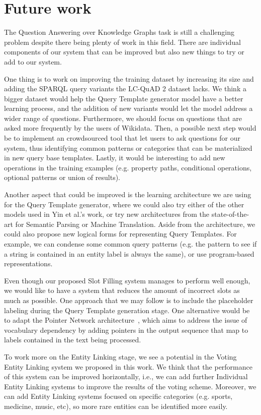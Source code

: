 \section{Future work}
\label{cap6:conclusions/futureWork}
The Question Answering over Knowledge Graphs task is still a challenging problem despite there being 
plenty of work in this field. There are individual components of our system that can be improved but 
also new things to try or add to our system.

One thing is to work on improving the training dataset by increasing its size and adding the SPARQL 
query variants the LC-QuAD 2 dataset lacks. We think a bigger dataset would help the Query Template 
generator model have a better learning process, and the addition of new variants would let the model 
address a wider range of questions. Furthermore, we should focus on questions that are asked more 
frequently by the users of Wikidata. Then, a possible next step would be to implement an crowdsourced 
tool that let users to ask questions for our system, thus identifying common patterns or categories 
that can be materialized in new query base templates. Lastly, it would be interesting to add new 
operations in the training examples (e.g. property paths, conditional operations, optional patterns 
or union of results).

Another aspect that could be improved is the learning architecture we are using for the Query 
Template generator, where we could also try either of the other models used in Yin et al.'s work, or 
try new architectures from the state-of-the-art for Semantic Parsing or Machine Translation. Aside 
from the architecture, we could also propose new logical forms for representing Query Templates. For 
example, we can condense some common query patterns (e.g. the pattern to see if a string is contained 
in an entity label is always the same), or use program-based representations. 

Even though our proposed Slot Filling system manages to perform well enough, we would like to have a 
system that reduces the amount of incorrect slots as much as possible. One approach that we may 
follow is to include the placeholder labeling during the Query Template generation stage. One 
alternative would be to adapt the Pointer Network architecture~\cite{key:vinyals2015pointer}, which 
aims to address the issue of vocabulary dependency by adding pointers in the output sequence that 
map to labels contained in the text being processed.

To work more on the Entity Linking stage, we see a potential in the Voting Entity Linking system we 
proposed in this work. We think that the performance of this system can be improved horizontally, 
i.e., we can add further Individual Entity Linking systems to improve the results of the voting scheme. 
Moreover, we can add Entity Linking systems focused on specific categories (e.g. sports, medicine, 
music, etc), so more rare entities can be identified more easily.

